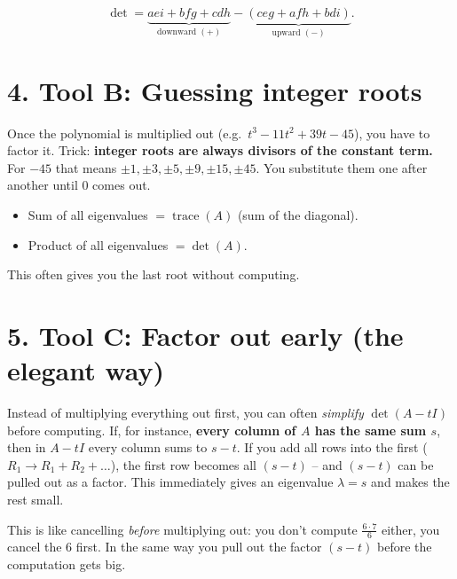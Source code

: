 \documentclass[a4paper,12pt]{article}
\begin{document}
\begin{merkbox}[title={Sarrus formula}]
\[
\det = \underbrace{aei + bfg + cdh}_{\text{downward }(+)} - \underbrace{(ceg + afh + bdi)}_{\text{upward }(-)}.
\]
\end{merkbox}

\section*{4. Tool B: Guessing integer roots}

Once the polynomial is multiplied out (e.g.\ $t^3 - 11t^2 + 39t - 45$), you have to factor it. Trick: \textbf{integer roots are always divisors of the constant term.} For $-45$ that means $\pm1, \pm3, \pm5, \pm9, \pm15, \pm45$. You substitute them one after another until $0$ comes out.

\begin{merkbox}[title={Two free checks}]
\begin{itemize}[leftmargin=*, nosep]
    \item Sum of all eigenvalues $= \operatorname{trace}(A)$ (sum of the diagonal).
    \item Product of all eigenvalues $= \det(A)$.
\end{itemize}
This often gives you the last root without computing.
\end{merkbox}

\section*{5. Tool C: Factor out early (the elegant way)}

Instead of multiplying everything out first, you can often \emph{simplify} $\det(A - tI)$ before computing. If, for instance, \textbf{every column of $A$ has the same sum $s$}, then in $A - tI$ every column sums to $s - t$. If you add all rows into the first ($R_1 \to R_1 + R_2 + \dots$), the first row becomes all $(s-t)$ -- and $(s-t)$ can be pulled out as a factor. This immediately gives an eigenvalue $\lambda = s$ and makes the rest small.

\begin{analogie}
This is like cancelling \emph{before} multiplying out: you don't compute $\frac{6\cdot 7}{6}$ either, you cancel the $6$ first. In the same way you pull out the factor $(s-t)$ before the computation gets big.
\end{analogie}
\end{document}
